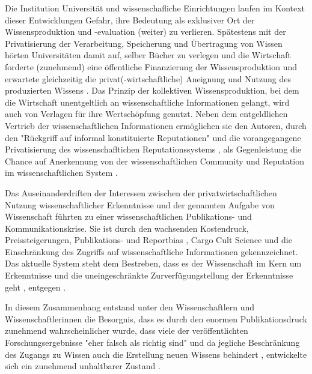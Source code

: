 Die Institution Universität und wissenschafliche Einrichtungen laufen im Kontext dieser Entwicklungen Gefahr, ihre Bedeutung als exklusiver Ort der Wissensproduktion und -evaluation (weiter) zu verlieren. Spätestens mit der Privatisierung der Verarbeitung, Speicherung und Übertragung von Wissen hörten Universitäten damit auf, selber Bücher zu verlegen \cite{cite:0} und die Wirtschaft forderte (zunehmend) eine öffentliche Finanzierung der Wissensproduktion und erwartete gleichzeitig die privat(-wirtschaftliche) Aneignung und Nutzung des produzierten Wissens \cite{cite:2}. Das Prinzip der kollektiven Wissensproduktion, bei dem die Wirtschaft unentgeltlich an wissenschaftliche Informationen gelangt, wird auch von Verlagen für ihre Wertschöpfung genutzt. Neben dem entgeldlichen Vertrieb der wissenschaftlichen Informationen ermöglichen sie den Autoren, durch den "Rückgriff auf informal konstituierte Reputationen" \cite{luhmann_1970_selbststeuerung} und die vorangegangene Privatisierung des wissenschafltichen Reputationssystems \cite{suchen}, als Gegenleistung die Chance auf Anerkennung von der wissenschaftlichen Community und Reputation im wissenschaftlichen System \cite{cite:21a}.

Das Auseinanderdriften der Interessen zwischen der privatwirtschaftlichen Nutzung wissenschaftlicher Erkenntnisse und der genannten Aufgabe von Wissenschaft führten zu einer wissenschaftlichen Publikations- und Kommunikationskrise. Sie ist durch den wachsenden Kostendruck, Preissteigerungen, Publikations- \cite{Egger_1997} \cite{Fanelli_2012} \cite{Beverungen_2012} \cite{Brembs_20013} und Reportbias \cite{Chan_2008} \cite{Dickersin_2011}, Cargo Cult Science \cite{Feynman_1974} und die Einschränkung des Zugriffs auf wissenschaftliche Informationen \cite{Hess_2006} gekennzeichnet. Das aktuelle System steht dem Bestreben, dass es der Wissenschaft im Kern um Erkenntnisse und die uneingeschränkte Zurverfügungstellung der Erkenntnisse geht \cite{hanekop_2006}, entgegen \cite{offhaus_2012_institutionelle_repos}.

In diesem Zusammenhang entstand unter den Wissenschaftlern und Wissenschaftlerinnen die Besorgnis, dass es durch den enormen Publikationsdruck zunehmend wahrscheinlicher wurde, dass viele der veröffentlichten Forschungsergebnisse "eher falsch als richtig sind" \cite{Ioannidis_2005} und da jegliche Beschränkung des Zugangs zu Wissen auch die Erstellung neuen Wissens behindert \cite{cite:5} \cite{cite:8} \cite{Luhmann1998}, entwickelte sich ein zunehmend unhaltbarer Zustand \cite{Schekman_2013}.

